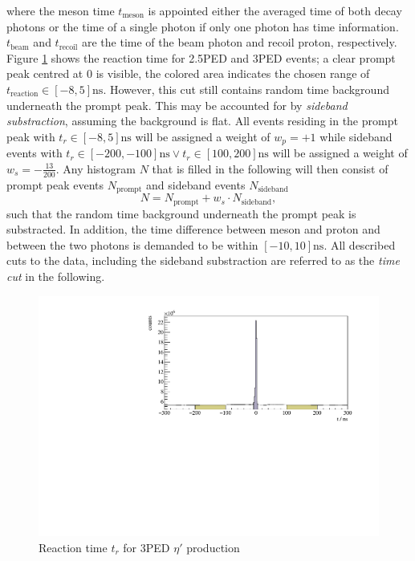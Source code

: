 where the meson time $t_\text{meson}$ is appointed either the averaged time of both decay photons or the time of a single photon if only one photon has time information. $t_\text{beam}$ and $t_\text{recoil}$ are the time of the beam photon and recoil proton, respectively. Figure \ref{fig:time_r} shows the reaction time for 2.5PED and 3PED events; a clear prompt peak centred at 0 is visible, the colored area indicates the chosen range of $t_\text{reaction}\in[-8,5]\si{\nano\s}$. However, this cut still contains random time background underneath the prompt peak. This may be accounted for by \emph{sideband substraction}, assuming the background is flat. All events residing in the prompt peak with $t_r\in[-8,5]\si{\nano\s}$ will be assigned a weight of $w_p=+1$ while sideband events with $t_r\in[-200,-100]\si{\nano\s}\lor t_r\in[100,200]\si{\nano\s}$ will be assigned a weight of $w_s=-\frac{13}{200}$. Any histogram $N$ that is filled in the following will then consist of prompt peak events $N_\text{prompt}$ and sideband events $N_\text{sideband}$ $$N=N_\text{prompt}+w_s\cdot N_\text{sideband},$$ such that the random time background underneath the prompt peak is substracted. In addition, the time difference between meson and proton and between the two photons is demanded to be within $[-10,10]\si{\nano\s}$. All described cuts to the data, including the sideband substraction are referred to as the \emph{time cut} in the following.

\begin{figure}[htbp]
	\centering
	\includegraphics[width=\linewidth]{../figs/hydrogen/time/reaction_time.pdf}
	\caption{Reaction time $t_r$ for 3PED $\eta'$ production}
	\label{fig:time_r}
\end{figure} 

